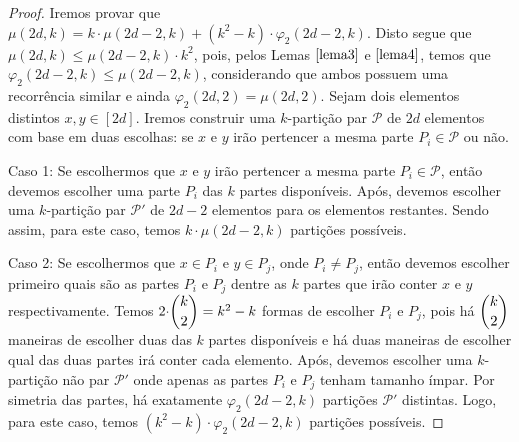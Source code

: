 \begin{proof}
	Iremos provar que $\mu(2d, k) = k {\cdot} \mu(2d - 2, k) + (k^2 - k) {\cdot} \varphi_2(2d - 2, k)$. Disto segue que $\mu(2d, k) \leq \mu(2d - 2, k) {\cdot} k^{2}$, pois, pelos Lemas $\ref{lema3}$ e $\ref{lema4}$, temos que $\varphi_2(2d - 2, k) \leq \mu(2d - 2, k)$, considerando que ambos possuem uma recorrência similar e ainda $\varphi_2(2d, 2) = \mu(2d, 2)$. Sejam dois elementos distintos $x, y \in [2d]$. Iremos construir uma $k$-partição par $\mathcal{P}$ de $2d$ elementos com base em duas escolhas: se $x$ e $y$ irão pertencer a mesma parte $P_i \in \mathcal{P}$ ou não. \newl
	
	Caso 1: Se escolhermos que $x$ e $y$ irão pertencer a mesma parte $P_i \in \mathcal{P}$, então devemos escolher uma parte $P_i$ das $k$ partes disponíveis. Após, devemos escolher uma $k$-partição par $\mathcal{P'}$ de $2d - 2$ elementos para os elementos restantes. Sendo assim, para este caso, temos $k {\cdot} \mu(2d - 2, k)$ partições possíveis. \newl 
	
	Caso 2: Se escolhermos que $x \in P_i$ e $y \in P_j$, onde $P_i \neq P_j$, então devemos escolher primeiro quais são as partes $P_i$ e $P_j$ dentre as $k$ partes que irão conter $x$ e $y$ respectivamente. Temos $2 {\cdot} \escolhe{k}{2} = k^2 - k$ formas de escolher $P_i$ e $P_j$, pois há $\escolhe{k}{2}$ maneiras de escolher duas das $k$ partes disponíveis e há duas maneiras de escolher qual das duas partes irá conter cada elemento. Após, devemos escolher uma $k$-partição não par $\mathcal{P'}$ onde apenas as partes $P_i$ e $P_j$ tenham tamanho ímpar. Por simetria das partes, há exatamente $\varphi_2(2d - 2, k)$ partições $\mathcal{P'}$ distintas. Logo, para este caso, temos $(k^2 - k) {\cdot} \varphi_2(2d - 2, k)$ partições possíveis.
	
	
\end{proof} \newl


